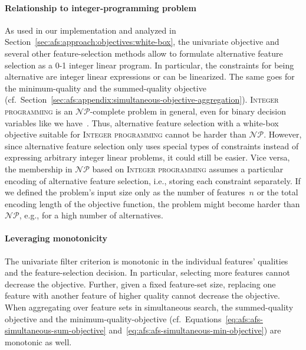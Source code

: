 \documentclass{article}
\theoremstyle{definition}
\begin{document}
\paragraph{Relationship to integer-programming problem}

As used in our implementation and analyzed in Section~\ref{sec:afs:approach:objectives:white-box}, the univariate objective and several other feature-selection methods allow to formulate alternative feature selection as a 0-1 integer linear program.
In particular, the constraints for being alternative are integer linear expressions or can be linearized.
The same goes for the minimum-quality and the summed-quality objective (cf.~Section~\ref{sec:afs:appendix:simultaneous-objective-aggregation}).
\textsc{Integer programming} is an $\mathcal{NP}$-complete problem in general, even for binary decision variables like we have~\cite{garey2003computers, karp1972reducibility}.
Thus, alternative feature selection with a white-box objective suitable for \textsc{Integer programming} cannot be harder than $\mathcal{NP}$.
However, since alternative feature selection only uses special types of constraints instead of expressing arbitrary integer linear problems, it could still be easier.
Vice versa, the membership in $\mathcal{NP}$ based on \textsc{Integer programming} assumes a particular encoding of alternative feature selection, i.e., storing each constraint separately.
If we defined the problem's input size only as the number of features~$n$ or the total encoding length of the objective function, the problem might become harder than $\mathcal{NP}$, e.g., for a high number of alternatives.

\paragraph{Leveraging monotonicity}

The univariate filter criterion is monotonic in the individual features' qualities and the feature-selection decision.
In particular, selecting more features cannot decrease the objective.
Further, given a fixed feature-set size, replacing one feature with another feature of higher quality cannot decrease the objective.
When aggregating over feature sets in simultaneous search, the summed-quality objective and the minimum-quality-objective (cf.~Equations~\ref{eq:afs:afs-simultaneous-sum-objective} and~\ref{eq:afs:afs-simultaneous-min-objective}) are monotonic as well.
\end{document}
